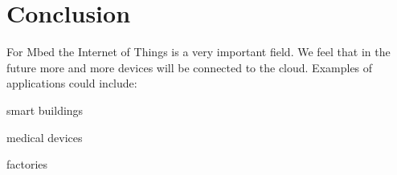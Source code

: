 \documentclass[pdftex,10pt,a4paper]{report}
\newenvironment{packed_item}{
\begin{itemize}
  \setlength{\itemsep}{1pt}
  \setlength{\parskip}{0pt}
  \setlength{\parsep}{0pt}
}{\end{itemize}}
\begin{document}

\section{Conclusion}
For Mbed the Internet of Things is a very important field. We feel that in the future more and more devices will be connected to the cloud. Examples of applications could include:
\begin{packed_item}
	\item smart buildings
	\item medical devices
	\item factories
\end{packed_item}
\end{document}
